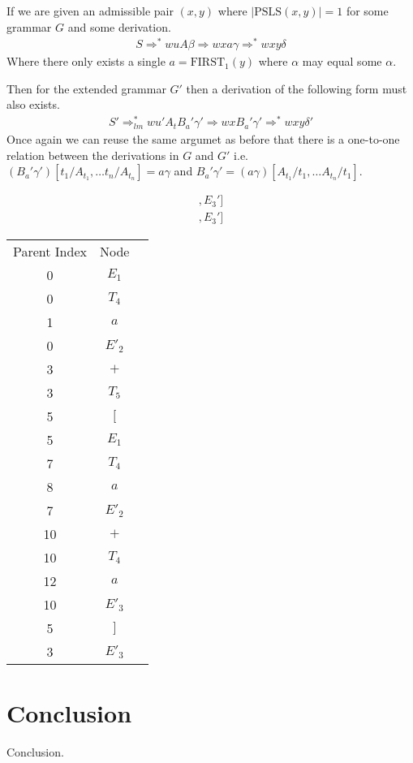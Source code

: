 \documentclass[a4paper,12pt]{article}
\newcommand\PSLS{\text{PSLS}}
\theoremstyle{definition}
\begin{document}
If we are given an admissible pair $(x, y)$ where $|\PSLS(x, y)| = 1$ for some grammar $G$ and some derivation.
\begin{align*}
  S \Rightarrow^* wuA\beta \Rightarrow wxa\gamma \Rightarrow^* wxy\delta
\end{align*}
Where there only exists a single $a = \text{FIRST}_1(y)$ where $\alpha$ may equal some $\alpha$.

Then for the extended grammar $G'$ then a derivation of the following form must also exists.
\begin{align*}
  S' \Rightarrow^*_{lm} wu'A_tB_a'\gamma' \Rightarrow wxB_a'\gamma' \Rightarrow^* wxy\delta'
\end{align*}
Once again we can reuse the same argumet as before that there is a one-to-one relation between the derivations in $G$ and $G'$ i.e. $(B_a'\gamma')[t_1/A_{t_1}, \dots t_n/A_{t_n}] = a\gamma$ and $B_a'\gamma' = (a\gamma)[A_{t_1}/t_1, \dots A_{t_n}/t_1]$.

\begin{gather*}
  [E_1, T_4, A_a, E_2', A_+, T_5, A_[, E_1, T_4, A_a, E_2', A_+, T_4, A_a, E_3', A_], E_3']
\end{gather*}
\begin{gather*}
  [E_1, T_4, a, E_2', +, T_5, [, E_1, T_4, a, E_2', +, T_4, a, E_3', ], E_3']
\end{gather*}
\begin{table}[H]
  \centering
  \begin{tabular}{c|c|c}
    Parent Index & Node \\
    0  &  $E_1$ \\ \hline
    0  &  $T_4$ \\ \hline
    1  &  $a$ \\ \hline
    0  &  $E'_2$ \\ \hline
    3  &  $+$ \\ \hline
    3  &  $T_5$ \\ \hline
    5  &  $[$ \\ \hline
    5  &  $E_1$ \\ \hline
    7  &  $T_4$ \\ \hline
    8  &  $a$ \\ \hline
    7  &  $E'_2$ \\ \hline
    10 &  $+$ \\ \hline
    10 &  $T_4$ \\ \hline
    12 &  $a$ \\ \hline
    10 &  $E'_3$ \\ \hline
    5  &  $]$ \\ \hline
    3  &  $E'_3$
  \end{tabular}
\end{table}

\section{Conclusion}
Conclusion.
\printbibliography
\end{document}
